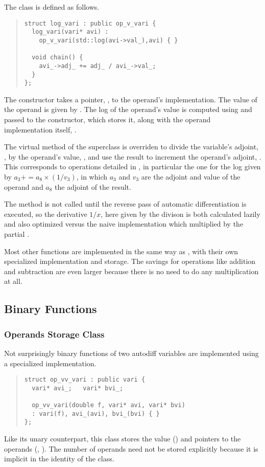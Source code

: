\documentclass[10pt]{article}
\begin{document}
The class  is defined as follows.
%
\begin{quote}
\begin{Verbatim}
struct log_vari : public op_v_vari {
  log_vari(vari* avi) :
    op_v_vari(std::log(avi->val_),avi) { }

  void chain() {
    avi_->adj_ += adj_ / avi_->val_;
  }
};
\end{Verbatim}
\end{quote}
%
The constructor takes a pointer, , to the operand's
implementation.  The value of the operand is given by
.  The log of the operand's value is computed using
 and passed to the  constructor,
which stores it, along with the operand implementation itself,
.  

The virtual  method of the superclass 
is overriden to divide the variable's adjoint, , by the
operand's value, , and use the result to increment
the operand's adjoint, .  This corresponds to
\code{+=} operations detailed in , in
particular the one for the log given by $a_3 += a_8 \times (1 / v_3)$,
in which $a_3$ and $v_3$ are the adjoint and value of the operand and
$a_8$ the adjoint of the result.

The  method is not called until the reverse pass of
automatic differentiation is executed, so the derivative $1/x$, here
given by the divison  is both calculated lazily
and also optimized versus the naive implementation which multiplied
 by the partial .  

Most other functions are implemented in the same way as ,
with their own specialized  implementation and storage.
The savings for operations like addition and subtraction are even
larger because there is no need to do any multiplication at all.

\subsection{Binary Functions}

\subsubsection{Operands Storage Class}

Not surprisingly binary functions of two autodiff variables are
implemented using a specialized  implementation.
%
\begin{quote}
\begin{Verbatim}
struct op_vv_vari : public vari {
  vari* avi_;   vari* bvi_;

  op_vv_vari(double f, vari* avi, vari* bvi)
  : vari(f), avi_(avi), bvi_(bvi) { }
};
\end{Verbatim}
\end{quote}
%
Like its unary counterpart, this class stores the value () and
pointers to the operands (, ).  The number of
operands need not be stored explicitly because it is implicit in the
identity of the class. 
\end{document}
